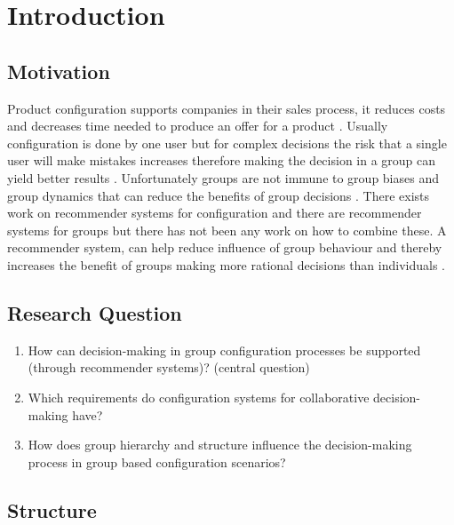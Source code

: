 \chapter{Introduction}
\label{ch:Introduction}

\section{Motivation}
\label{sec:Introduction:Motivation}

Product configuration supports companies in their sales process, it reduces costs and decreases time needed to produce an offer for a product \cite{shafieeCostBenefitAnalysis2018}. Usually configuration is done by one user but for complex decisions the risk that a single user will make mistakes increases therefore making the decision in a group can yield better results \cite{felferningGroupBasedConfiguration2016, felfernigGroupDecisionSupport2011}. Unfortunately groups are not immune to group biases and group dynamics that can reduce the benefits of group decisions \cite{kerrBiasJudgmentComparing1996}.
There exists work on recommender systems for configuration and there are recommender systems for groups but there has not been any work on how to combine these. A recommender system, can help reduce influence of group behaviour and thereby increases the benefit of groups making more rational decisions than individuals \cite{charnessGroupsMakeBetter2012}.

\section{Research Question}
\label{sec:Introduction:ResearchQuestion}
\begin{enumerate}
    \item How can decision-making in group configuration processes be supported (through recommender systems)? (central question)
    \item Which requirements do configuration systems for collaborative decision-making have?
    \item How does group hierarchy and structure influence the decision-making process in group based configuration scenarios?
\end{enumerate}

\section{Structure}
\label{sec:Introduction:Structure}
